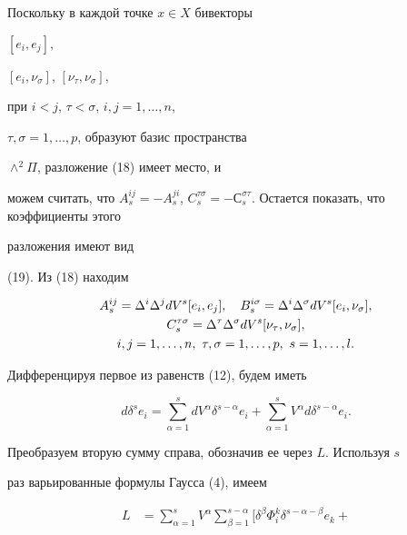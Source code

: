 \begin{pf} Поскольку в каждой точке $x\in X$ бивекторы


$[e_i,e_j]$,


$[e_i,\nu_{\sigma}]$, $[\nu_{\tau},\nu_{\sigma}]$,


при $i<j$, $\tau<\sigma$, $i,j=1,\dotsc,n$,


$\tau,\sigma=1,\dotsc,p$, образуют базис пространства


$\wedge^2\Pi$, разложение (18) имеет место, и


можем считать, что $A^{ij}_s= -A^{ji}_s$, $C_s^{\tau\sigma}= 


-С^{\sigma\tau}_s$. Остается показать, что коэффициенты этого


разложения имеют вид


(19). Из (18) находим


\begin{gather}


A^{ij}_s=\Delta^i\Delta^jdV^s[e_i,e_j], \quad


B^{i\sigma}_s=\Delta^i\Delta^{\sigma}dV^s[e_i,\nu_{\sigma}],\notag\\


C^{\tau\sigma}_s=\Delta^{\tau}\Delta^{\sigma}dV^s


[\nu_{\tau},\nu_{\sigma}],\\


i,j=1,\dotsc,n,\ \tau,\sigma=1,\dotsc,p,\ s=1,\dotsc,l.\notag


\end{gather}


Дифференцируя первое из равенств (12), будем иметь


\begin{equation}


d\delta^se_i=\sum_{\alpha=1}^{s}dV^{\alpha}\delta^{s-\alpha}e_i+


\sum_{\alpha=1}^{s}V^{\alpha}d\delta^{s-\alpha}e_i.


\end{equation}


Преобразуем вторую сумму справа, обозначив ее через $L$. Используя $s$


раз варьированные формулы Гаусса (4), имеем


\begin{align*}


L&=


\sum_{\alpha=1}^{s}V^{\alpha}\sum_{\beta=1}^{s-\alpha}[\delta^{\beta}


\Phi^k_i\delta^{s-\alpha-\beta}e_k+



\end{align*}
\end{pf}
